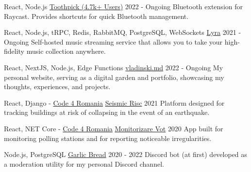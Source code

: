 
\begin{cventries}

  \cventry
  {React, Node.js}
  {\href{https://github.com/VladCuciureanu/Toothpick}{Toothpick (4.7k+ Users)}}
  {}
  {2022 - Ongoing}
  {
    Bluetooth extension for Raycast. Provides shortcuts for quick Bluetooth management.
  }

  \cventry
  {React, Node.js, tRPC, Redis, RabbitMQ, PostgreSQL, WebSockets}
  {\href{https://github.com/VladCuciureanu/Lyra}{Lyra}}
  {}
  {2021 - Ongoing}
  {
    Self-hosted music streaming service that allows you to take your high-fidelity music collection anywhere.
  }

  \cventry
  {React, NextJS, Node.js, Edge Functions}
  {\href{https://vladinski.md}{vladinski.md}}
  {}
  {2022 - Ongoing}
  {
    My personal website, serving as a digital garden and portfolio, showcasing my thoughts, experiences, and projects.
  }

  \cventry
  {React, Django - \href{https://code4.ro}{Code 4 Romania}}
  {\href{https://github.com/code4romania/seismic-risc}{Seismic Risc}}
  {}
  {2021}
  {
    Platform designed for tracking buildings at risk of collapsing in the event of an earthquake.
  }

  \cventry
  {React, NET Core - \href{https://code4.ro}{Code 4 Romania}}
  {\href{https://github.com/code4romania/monitorizare-vot/wiki}{Monitorizare Vot}}
  {}
  {2020}
  {
    App built for monitoring polling stations and for reporting noticeable irregularities.
  }

  \cventry
  {Node.js, PostgreSQL}
  {\href{https://github.com/VladCuciureanu/GarlicBread}{Garlic Bread}}
  {}
  {2020 - 2022}
  {
    Discord bot (at first) developed as a moderation utility for my personal Discord channel.
  }

\end{cventries}